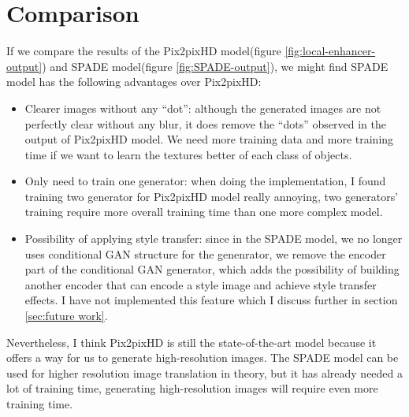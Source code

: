 \section{Comparison}
If we compare the results of the Pix2pixHD model(figure \ref{fig:local-enhancer-output}) and 
SPADE model(figure \ref{fig:SPADE-output}), we might find SPADE model has the following 
advantages over Pix2pixHD: 
\begin{itemize}
    \item Clearer images without any “dot”: although the generated images are not perfectly 
    clear without any blur, it does remove the “dots” observed in the output of Pix2pixHD 
    model. We need more training data and more training time if we want to learn the textures 
    better of each class of objects.
    \item Only need to train one generator: when doing the implementation, I found training 
    two generator for Pix2pixHD model really annoying, two generators' training require more 
    overall training time than one more complex model.
    \item Possibility of applying style transfer: since in the SPADE model, we no longer uses 
    conditional GAN structure for the genenrator, we remove the encoder part of the conditional 
    GAN generator, which adds the possibility of building another encoder that can encode a 
    style image and achieve style transfer effects. I have not implemented this feature which I 
    discuss further in section \ref{sec:future work}.
\end{itemize}

Nevertheless, I think Pix2pixHD is still the state-of-the-art model because it offers a way for 
us to generate high-resolution images. The SPADE model can be used for higher resolution image 
translation in theory, but it has already needed a lot of training time, generating high-resolution 
images will require even more training time.